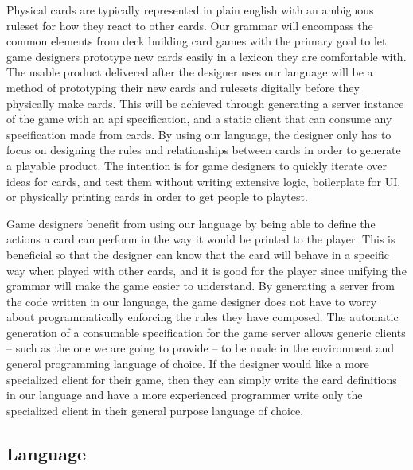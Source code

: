 \documentclass{acm_proc_article-sp}
\begin{document}
Physical cards are typically represented in plain english with an ambiguous ruleset 
for how they react to other cards. Our grammar will encompass the common elements from 
deck building card games with the primary goal to let game designers prototype new cards
easily in a lexicon they are comfortable with. The usable product delivered after the 
designer uses our language will be a method of prototyping their new cards and rulesets
digitally before they physically make cards. This will be achieved through generating a 
server instance of the game with an api specification, and a static client that can consume
any specification made from cards. By using our language, the designer only has to focus on
designing the rules and relationships between cards in order to generate a playable product.
The intention is for game designers to quickly iterate over ideas for cards, and test them 
without writing extensive logic, boilerplate for UI, or physically printing cards in order to 
get people to playtest.


Game designers benefit from using our language by being able to define the actions a card
can perform in the way it would be printed to the player. This is beneficial so that the designer
can know that the card will behave in a specific way when played with other cards, and it is good for
the player since unifying the grammar will make the game easier to understand. By generating a server
from the code written in our language, the game designer does not have to worry about programmatically 
enforcing the rules they have composed. The automatic generation of a consumable specification for the 
game server allows generic clients -- such as the one we are going to provide -- to be made in the environment
and general programming language of choice. If the designer would like a more specialized client for their game,
then they can simply write the card definitions in our language and have a more experienced programmer write
only the specialized client in their general purpose language of choice.


\subsection{Language}
\label{sec:language}
\end{document}
